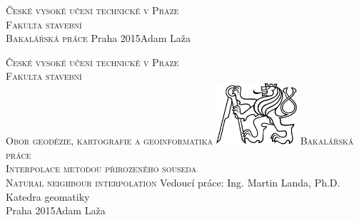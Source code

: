\begin{center}
\newcommand{\napisCVUT}{České vysoké učení technické v Praze}
\newcommand{\napisFS}{Fakulta stavební}
\newcommand{\napisObor}{Obor geodézie, kartografie a geoinformatika}
\newcommand{\napisKatedra}{Katedra geomatiky}
\newcommand{\napisVedouci}{Vedoucí práce: Ing. Martin Landa, Ph.D.}
\newcommand{\napisAutor}{Adam Laža}
\newcommand{\napisDatum}{Praha 2015}
\newcommand{\napisNazevI}{Interpolace metodou přirozeného souseda}
\newcommand{\napisNazevAjI}{Natural neighbour interpolation}
\newcommand{\napisBakalarka}{Bakalářská práce}
\newcommand{\napisPraha}{Praha 2015}
%
\newcommand{\velka}[1]{\textsc{#1}}
%
% 
\newif\ifpatitul
\patitultrue

\ifpatitul
{\Large\velka{\napisCVUT}}\\
\velka{\Large\napisFS}\\
\vfill
{\LARGE\velka{\napisBakalarka}}
\vfill
{\large\napisPraha\hfill\napisAutor}
\newpage
\fi%


{\Large\velka{\napisCVUT}}\\
{\Large\velka{\napisFS}}\\
{\Large\velka{\napisObor}}
\vfill
\includegraphics[width=3cm]{logo_cvut_cb} %
\vfill
{\Large\velka{\napisBakalarka}}\\
\Large\velka{\napisNazevI}\\
\large\velka{\napisNazevAjI}
\vfill
{\large%
\napisVedouci\\
\napisKatedra\\
\bigskip
\napisDatum\hfill\napisAutor}
\end{center}
